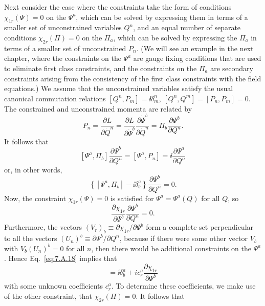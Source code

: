 Next consider the case where the constraints take the form of conditions
$\chi_{1r}(\Psi)=0$ on the $\Psi^a$, which can be solved by expressing them in
terms of a smaller set of unconstrained variables $Q^n$, and an equal number
of separate conditions $\chi_{2r}(\Pi)=0$ on the $\Pi_a$, which can be solved
by expressing the $\Pi_a$ in terms of a smaller set of unconstrained $P_n$.
(We will see an example in the next chapter, where the constraints on the
$\Psi^a$ are gauge fixing conditions that are used to eliminate first class
constraints, and the constraints on the $\Pi_a$ are secondary constraints
arising from the consistency of the first class constraints with the field
equations.) We assume that the unconstrained variables satisfy the usual
canonical commutation relations
$[Q^n,P_m]=\ii\delta^n_m$, $[Q^n,Q^m]=[P_n,P_m]=0$. The constrained and
unconstrained momenta are related by
\begin{equation}
  P_n=\frac{\partial L}{\partial\dot Q^n}
  =\frac{\partial L}{\partial\dot\Psi^b}
    \frac{\partial\dot\Psi^b}{\partial\dot Q^n}
  =\Pi_b\frac{\partial\Psi^b}{\partial Q^n}.
  \tag{7.A.17}\label{eq:7.A.17}
\end{equation}
It follows that
\[
  [\Psi^a,\Pi_b]\frac{\partial\Psi^b}{\partial Q^n}
  =[\Psi^a,P_n]=\ii\frac{\partial\Psi^a}{\partial Q^n}
\]
or, in other words,
\begin{equation}
  \left\{[\Psi^a,\Pi_b]-\ii\delta^a_b\right\}
  \frac{\partial\Psi^b}{\partial Q^n}=0.
  \tag{7.A.18}\label{eq:7.A.18}
\end{equation}
Now, the constraint $\chi_{1r}(\Psi)=0$ is satisfied for
$\Psi^a=\Psi^a(Q)$ for all $Q$, so
\begin{equation}
  \frac{\partial\chi_{1r}}{\partial\Psi^b}
  \frac{\partial\Psi^b}{\partial Q^n}=0.
  \tag{7.A.19}\label{eq:7.A.19}
\end{equation}
Furthermore, the vectors $(V_r)_b\equiv\partial\chi_{1r}/\partial\Psi^b$
form a complete set perpendicular to all the vectors
$(U_n)^b\equiv\partial\Psi^b/\partial Q^n$, because if there were some other
vector $V_b$ with $V_b(U_n)^b=0$ for all $n$, then there would be additional
constraints on the $\Psi^a$. Hence Eq.~\eqref{eq:7.A.18} implies that
\begin{equation}
  [\Psi^a,\Pi_b]=\ii\delta^a_b+ic^a_r
  \frac{\partial\chi_{1r}}{\partial\Psi^b}
  \tag{7.A.20}\label{eq:7.A.20}
\end{equation}
with some unknown coefficients $c^a_r$. To determine these coefficients, we
make use of the other constraint, that $\chi_{2r}(\Pi)=0$. It follows that
